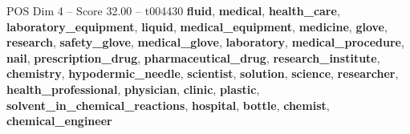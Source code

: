\begin{textsample}{POS Dim 4 – Score 32.00 – t004430}  \label{ex:f4_pos_003}
\textbf{fluid}, \textbf{medical}, \textbf{health\_care}, \textbf{laboratory\_equipment}, \textbf{liquid}, \textbf{medical\_equipment}, \textbf{medicine}, \textbf{glove}, \textbf{research}, \textbf{safety\_glove}, \textbf{medical\_glove}, \textbf{laboratory}, \textbf{medical\_procedure}, \textbf{nail}, \textbf{prescription\_drug}, \textbf{pharmaceutical\_drug}, \textbf{research\_institute}, \textbf{chemistry}, \textbf{hypodermic\_needle}, \textbf{scientist}, \textbf{solution}, \textbf{science}, \textbf{researcher}, \textbf{health\_professional}, \textbf{physician}, \textbf{clinic}, \textbf{plastic}, \textbf{solvent\_in\_chemical\_reactions}, \textbf{hospital}, \textbf{bottle}, \textbf{chemist}, \textbf{chemical\_engineer}

\end{textsample}
